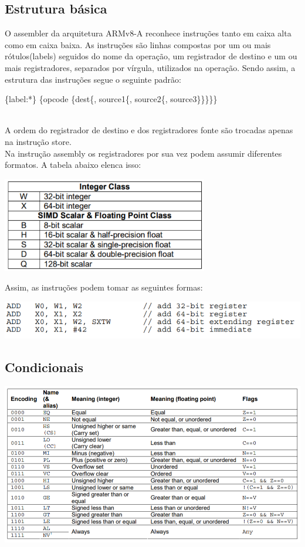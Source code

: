 \documentclass[12pt,a4paper,utf8]{ppgsi}
\begin{document}
\subsection{Estrutura básica}
O assembler da arquitetura ARMv8-A reconhece instruções tanto em caixa alta como em caixa baixa. As instruções são linhas compostas por um ou mais rótulos(labels) seguidos do nome da operação, um registrador de destino e um ou mais registradores, separados por vírgula, utilizados na operação. Sendo assim, a estrutura das instruções segue o seguinte padrão:
\\\centerline{\{label:*\} \{opcode \{dest\{, source1\{, source2\{, source3\}\}\}\}\}}
\\A ordem do registrador de destino e dos registradores fonte são trocadas apenas na instrução store.
\\Na instrução assembly os registradores por sua vez podem assumir diferentes formatos. A tabela abaixo elenca isso:
\begin{center}
\includegraphics[width=9cm]{figuras/RegisterTable.PNG}
\end{center}
Assim, as instruções podem tomar as seguintes formas:
\begin{center}
\includegraphics[width=15cm]{RT/figuras/RegisterTypesExample.PNG}
\end{center}

\subsection{Condicionais}
\begin{center}
\includegraphics[width=15cm]{figuras/ConditionalIntructionTable.PNG}
\end{center}
\end{document}
